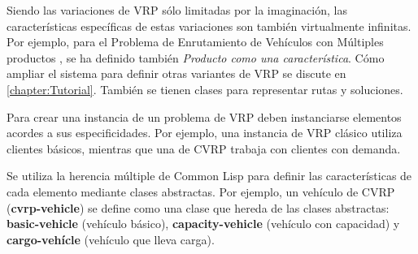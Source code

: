 Siendo las variaciones de VRP sólo limitadas por la imaginación, las características específicas de estas variaciones son también virtualmente infinitas. Por ejemplo, para el Problema de Enrutamiento de Vehículos con Múltiples productos \cite{TODO}, se ha definido también \textit{Producto como una característica}. Cómo ampliar el sistema para definir otras variantes de VRP se discute en \ref{chapter:Tutorial}. También se tienen clases para representar rutas y soluciones.

Para crear una instancia de un problema de VRP deben instanciarse elementos acordes a sus especificidades. Por ejemplo, una instancia de VRP clásico utiliza clientes básicos, mientras que una de CVRP trabaja con clientes con demanda.

Se utiliza la herencia múltiple de Common Lisp para definir las características de cada elemento mediante clases abstractas. Por ejemplo, un vehículo de CVRP (\textbf{cvrp-vehicle}) se define como una clase que hereda de las clases abstractas: \textbf{basic-vehicle} (vehículo básico), \textbf{capacity-vehicle} (vehículo con capacidad) y \textbf{cargo-vehícle} (vehículo que lleva carga).














